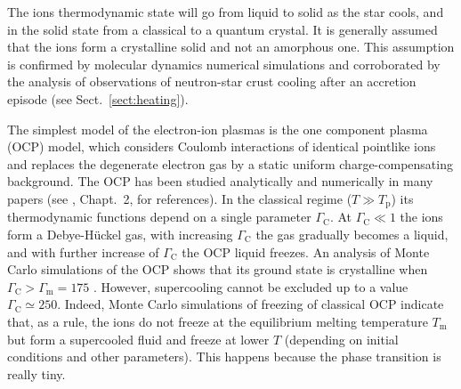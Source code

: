\documentclass[smallextended]{svjour3}       %
\newcommand{\Gami}{\Gamma_{\mathrm{C}}}
\newcommand{\Gammam}{\Gamma_\mathrm{m}}
\newcommand{\Tp}{T_\mathrm{p}}
\newcommand{\Tm}{T_\mathrm{m}}
\begin{document}
The ions thermodynamic state will go from liquid to solid as
the star cools, and in the solid state from a classical to a
quantum crystal. It is generally assumed that the ions form
a crystalline solid and not an amorphous one. This
assumption is confirmed by molecular dynamics numerical
simulations \citep{Hughto-ea11} and corroborated by the
analysis of observations of neutron-star crust cooling after
an accretion episode (see Sect.~\ref{sect:heating}).

The simplest model of the electron-ion plasmas is  the one
component plasma (OCP) model, which considers Coulomb
interactions of identical pointlike ions and replaces the
degenerate electron gas by a static uniform
charge-compensating background. The OCP has been studied
analytically and numerically in many papers (see
\citealt{HPY07}, Chapt.~2, for references). In the classical
regime ($T\gg\Tp$) its thermodynamic functions depend on a
single parameter $\Gami$. At $\Gami\ll1$ the ions form a
Debye-H\"uckel gas, with increasing $\Gami$ the gas
gradually becomes a liquid, and with further increase of
$\Gami$ the OCP liquid freezes. An analysis of Monte Carlo
simulations of the OCP shows that its ground state is
crystalline when $\Gami>\Gammam=175$ \citep{PC00}. However,
supercooling cannot be excluded up to a value $\Gami\simeq
250$. Indeed, Monte Carlo simulations of freezing of
classical OCP \citep{DeWittSY93} indicate that, as a rule,
the ions do not freeze at the equilibrium melting
temperature $\Tm$ but form a supercooled fluid and freeze at
lower $T$ (depending on initial conditions and other
parameters). This happens because the phase transition is
really tiny.
\end{document}
